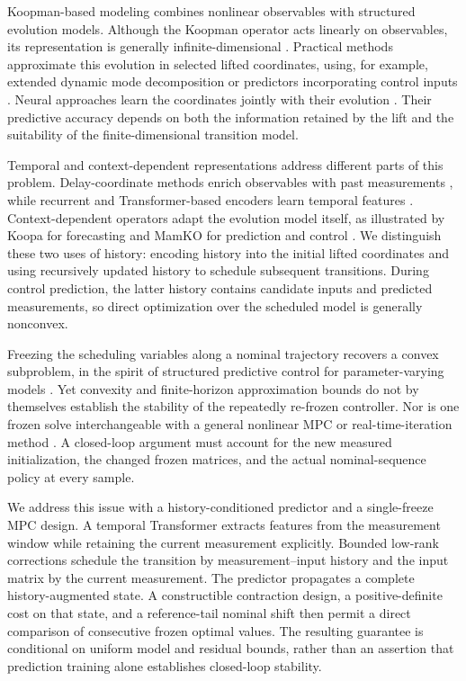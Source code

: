 \documentclass[journal]{IEEEtran}
\begin{document}
Koopman-based modeling combines nonlinear observables with structured evolution models. Although the Koopman operator acts linearly on observables, its representation is generally infinite-dimensional \cite{koopman1931hamiltonian,mezic2005spectral,brunton2022modern}. Practical methods approximate this evolution in selected lifted coordinates, using, for example, extended dynamic mode decomposition or predictors incorporating control inputs \cite{williams2015data,proctor2016dmdc,korda2018linear}. Neural approaches learn the coordinates jointly with their evolution \cite{takeishi2017koopman,lusch2018deep,otto2019linearly,han2020deep}. Their predictive accuracy depends on both the information retained by the lift and the suitability of the finite-dimensional transition model.

Temporal and context-dependent representations address different parts of this problem. Delay-coordinate methods enrich observables with past measurements \cite{kamb2020timedelay,das2019delay}, while recurrent and Transformer-based encoders learn temporal features \cite{han2024robust,shenoy2025temporal,forootani2025deepkoopformer}. Context-dependent operators adapt the evolution model itself, as illustrated by Koopa for forecasting and MamKO for prediction and control \cite{liu2023koopa,li2025mamko}. We distinguish these two uses of history: encoding history into the initial lifted coordinates and using recursively updated history to schedule subsequent transitions. During control prediction, the latter history contains candidate inputs and predicted measurements, so direct optimization over the scheduled model is generally nonconvex.

Freezing the scheduling variables along a nominal trajectory recovers a convex subproblem, in the spirit of structured predictive control for parameter-varying models \cite{cisneros2016qlmpc,cisneros2020qlpv}. Yet convexity and finite-horizon approximation bounds do not by themselves establish the stability of the repeatedly re-frozen controller. Nor is one frozen solve interchangeable with a general nonlinear MPC or real-time-iteration method \cite{diehl2005realtime,gros2020rti}. A closed-loop argument must account for the new measured initialization, the changed frozen matrices, and the actual nominal-sequence policy at every sample.

We address this issue with a history-conditioned predictor and a single-freeze MPC design. A temporal Transformer extracts features from the measurement window while retaining the current measurement explicitly. Bounded low-rank corrections schedule the transition by measurement--input history and the input matrix by the current measurement. The predictor propagates a complete history-augmented state. A constructible contraction design, a positive-definite cost on that state, and a reference-tail nominal shift then permit a direct comparison of consecutive frozen optimal values. The resulting guarantee is conditional on uniform model and residual bounds, rather than an assertion that prediction training alone establishes closed-loop stability.
\end{document}
